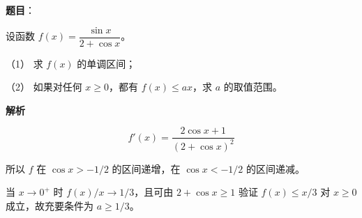 \begin{answer}

\textbf{题目}：

设函数 $f(x)=\dfrac{\sin x}{2+\cos x}$。

（1） 求 $f(x)$ 的单调区间；

（2） 如果对任何 $x\geqslant0$，都有 $f(x)\leqslant ax$，求 $a$ 的取值范围。

\textbf{解析}


\nopagebreak[4]
\[
f'(x)=\frac{2\cos x+1}{(2+\cos x)^2}
\]

所以 $f$ 在 $\cos x>-1/2$ 的区间递增，在 $\cos x<-1/2$ 的区间递减。


当 $x\to0^+$ 时 $f(x)/x\to1/3$，且可由 $2+\cos x\geqslant1$ 验证 $f(x)\leqslant x/3$ 对 $x\geqslant0$ 成立，故充要条件为 $a\geqslant1/3$。



\end{answer}